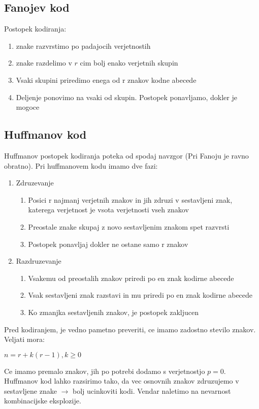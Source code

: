 \documentclass{article}
\begin{document}
\begin{multicols}{3}
\subsection{Fanojev kod}
Postopek kodiranja:
\begin{enumerate}
    \item znake razvrstimo po padajocih verjetnostih
    \item znake razdelimo v $r$ cim bolj enako verjetnih skupin
    \item Vsaki skupini priredimo enega od r znakov kodne abecede
    \item Deljenje ponovimo na vsaki od skupin. Postopek ponavljamo, dokler je mogoce
\end{enumerate}

\subsection{Huffmanov kod}
Huffmanov postopek kodiranja poteka od spodaj navzgor (Pri Fanoju je ravno obratno).
Pri huffmanovem kodu imamo dve fazi:
\begin{enumerate}
    \item Zdruzevanje
        \begin{enumerate}
            \item Posici r najmanj verjetnih znakov in jih zdruzi v sestavljeni znak, katerega verjetnost je vsota verjetnosti vseh znakov
            \item Preostale znake skupaj z novo sestavljenim znakom spet razvrsti
            \item Postopek ponavljaj dokler ne ostane samo r znakov
        \end{enumerate}
    \item Razdruzevanje
        \begin{enumerate}
            \item Vsakemu od preostalih znakov priredi po en znak kodirne abecede
            \item Vsak sestavljeni znak razstavi in mu priredi po en znak kodirne abecede
            \item Ko zmanjka sestavljenih znakov, je postopek zakljucen
        \end{enumerate}
\end{enumerate}
Pred kodiranjem, je vedno pametno preveriti, ce imamo zadostno stevilo znakov.
Veljati mora:
\begin{center}
    \begin{math}
        n = r + k(r-1), k \geq 0
    \end{math}
\end{center}
Ce imamo premalo znakov, jih po potrebi dodamo s verjetnostjo $p=0$.\\
Huffmanov kod lahko razsirimo tako, da vec osnovnih znakov zdruzujemo v sestavljene znake $\rightarrow$ bolj ucinkoviti kodi. Vendar
naletimo na nevarnost kombinacijske eksplozije.\\


\end{multicols}
\end{document}
